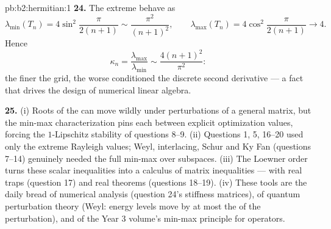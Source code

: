 \begin{solution}{pb:b2:hermitian:1}
\textbf{24.} The extreme  behave as
\[
\lambda_{\min}(T_n) = 4\sin^2\frac{\pi}{2(n+1)}
\sim \frac{\pi^2}{(n+1)^2},
\qquad
\lambda_{\max}(T_n) = 4\cos^2\frac{\pi}{2(n+1)}
\longrightarrow 4 .
\]
Hence
\[
\kappa_n = \frac{\lambda_{\max}}{\lambda_{\min}}
\sim \frac{4(n+1)^2}{\pi^2} :
\]
the finer the grid, the worse conditioned the discrete second
derivative --- a fact that drives the design of numerical
linear algebra.

\textbf{25.} (i) Roots of the  can
move wildly under perturbations of a general matrix, but the
min-max characterization pins each   between
explicit optimization values, forcing the $1$-Lipschitz
stability of questions 8--9. (ii) Questions 1, 5, 16--20 used
only the extreme Rayleigh values; Weyl, interlacing, Schur and
Ky Fan (questions 7--14) genuinely needed the full min-max
over subspaces. (iii) The Loewner order turns these scalar
inequalities into a calculus of matrix inequalities --- with
real traps (question 17) and real theorems (questions 18--19).
(iv) These tools are the daily bread of numerical analysis
(question 24's stiffness matrices), of quantum perturbation
theory (Weyl: energy levels move by at most the  of the
perturbation), and of the Year 3 volume's min-max principle
for   operators.
\end{solution}
